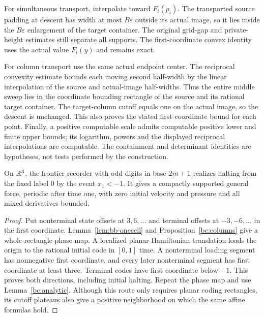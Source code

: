For simultaneous transport, interpolate toward $F_i(p_i)$. The transported
source padding at descent has width at most $B\varepsilon$ outside its
actual image, so it lies inside the $B\varepsilon$ enlargement of the
target container. The original grid-gap and private-height estimates
still separate all supports. The first-coordinate convex identity uses
the actual value $F_i(y)$ and remains exact.

For column transport use the same actual endpoint center. The reciprocal
convexity estimate bounds each moving second half-width by the linear
interpolation of the source and actual-image half-widths. Thus the entire
middle sweep lies in the coordinate bounding rectangle of the source and
its rational target container. The target-column cutoff equals one on
the actual image, so the descent is unchanged. This also proves the stated
first-coordinate bound for each point. Finally, a positive computable
scale admits computable positive lower and finite upper bounds; its
logarithm, powers and the displayed reciprocal interpolations are
computable. The containment and determinant identities are hypotheses,
not tests performed by the construction.

\begin{theorem}\label{bc:column-event}
On $\mathbb R^3$, the frontier recorder with odd digits in base $2m+1$ realizes
halting from the fixed label $0$ by the event $x_1<-1$. It gives a compactly
supported general force, periodic after time one, with zero initial
velocity and pressure and all mixed derivatives bounded.
\end{theorem}
\begin{proof}\label{bc:column-event-proof}
Put nonterminal state offsets at $3,6,\ldots$ and terminal offsets at
$-3,-6,\ldots$ in the first coordinate. Lemma~\ref{lem:bb-onecell} and
Proposition~\ref{bc:columns} give a whole-rectangle phase map. A localized
planar Hamiltonian translation loads the origin to the rational initial
code in $[0,1]$ time. A nonterminal loading segment has nonnegative first
coordinate, and every later nonterminal segment has first coordinate at
least three. Terminal codes have first coordinate below $-1$. This proves
both directions, including initial halting. Repeat the phase map and use
Lemma~\ref{bc:analytic}. Although this route only requires planar coding
rectangles, its cutoff plateaus also give a positive neighborhood on which
the same affine formulas hold.
\end{proof}

